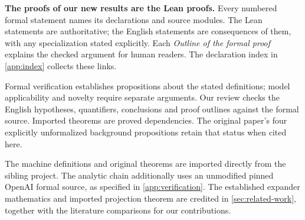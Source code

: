 \textbf{The proofs of our new results are the Lean proofs.} Every numbered
formal statement names its declarations and source modules. The Lean statements
are authoritative; the English statements are consequences of them, with any
specialization stated explicitly. Each \emph{Outline of the formal proof}
explains the checked argument for human readers. The declaration index in
\cref{app:index} collects these links.

Formal verification establishes propositions about the stated definitions;
model applicability and novelty require separate arguments. Our review checks
the English hypotheses, quantifiers, conclusions and proof outlines against
the formal source. Imported theorems are proved dependencies. The original
paper's four explicitly unformalized background propositions retain that
status when cited here.

The machine definitions and original theorems are imported directly from the
sibling project. The analytic chain additionally uses an unmodified pinned
OpenAI formal source, as specified in \cref{app:verification}. The established
expander mathematics and imported projection theorem are credited in
\cref{sec:related-work}, together with the literature comparisons for our
contributions.
